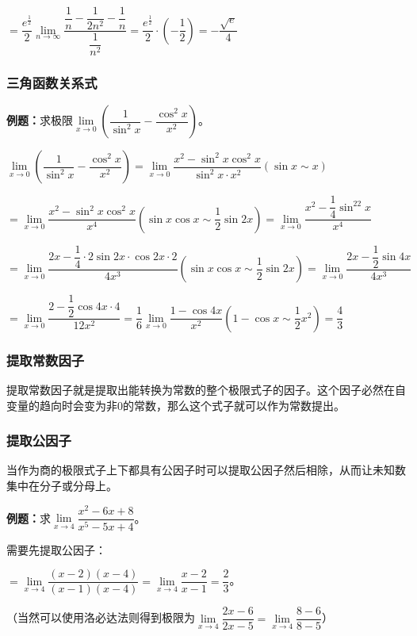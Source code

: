 \documentclass[UTF8, 12pt]{ctexart}
\begin{document}
$=\dfrac{e^{\frac{1}{2}}}{2}\lim\limits_{n\to\infty}\dfrac{\dfrac{1}{n}-\dfrac{1}{2n^2}-\dfrac{1}{n}}{\dfrac{1}{n^2}}=\dfrac{e^{\frac{1}{2}}}{2}\cdot\left(-\dfrac{1}{2}\right)=-\dfrac{\sqrt{e}}{4}$

\subsubsection{三角函数关系式}

\textbf{例题：}求极限$\lim\limits_{x\to 0}\left(\dfrac{1}{\sin^2x}-\dfrac{\cos^2x}{x^2}\right)$。\medskip

$\lim\limits_{x\to 0}\left(\dfrac{1}{\sin^2x}-\dfrac{\cos^2x}{x^2}\right)=\lim\limits_{x\to 0}\dfrac{x^2-\sin^2x\cos^2x}{\sin^2x\cdot x^2} (\sin x\sim x)$ \medskip

$=\lim\limits_{x\to 0}\dfrac{x^2-\sin^2x\cos^2x}{x^4} (\sin x\cos x\sim\dfrac{1}{2}\sin 2x)=\lim\limits_{x\to 0}\dfrac{x^2-\dfrac{1}{4}\sin^22x}{x^4}$ \medskip

$=\lim\limits_{x\to 0}\dfrac{2x-\dfrac{1}{4}\cdot 2\sin 2x\cdot\cos 2x\cdot 2}{4x^3} (\sin x\cos x\sim\dfrac{1}{2}\sin 2x)=\lim\limits_{x\to 0}\dfrac{2x-\dfrac{1}{2}\sin 4x}{4x^3}$ \medskip

$=\lim\limits_{x\to 0}\dfrac{2-\dfrac{1}{2}\cos 4x\cdot 4}{12x^2}=\dfrac{1}{6}\lim\limits_{x\to 0}\dfrac{1-\cos 4x}{x^2} (1-\cos x\sim \dfrac{1}{2}x^2)=\dfrac{4}{3}$

\subsubsection{提取常数因子}

提取常数因子就是提取出能转换为常数的整个极限式子的因子。这个因子必然在自变量的趋向时会变为非0的常数，那么这个式子就可以作为常数提出。

\subsubsection{提取公因子}

当作为商的极限式子上下都具有公因子时可以提取公因子然后相除，从而让未知数集中在分子或分母上。

\textbf{例题：}求$\lim\limits_{x\to 4}\dfrac{x^2-6x+8}{x^5-5x+4}$。

需要先提取公因子：

$=\lim\limits_{x\to 4}\dfrac{(x-2)(x-4)}{(x-1)(x-4)}=\lim\limits_{x\to 4}\dfrac{x-2}{x-1}=\dfrac{2}{3}$。

（当然可以使用洛必达法则得到极限为$\lim\limits_{x\to 4}\dfrac{2x-6}{2x-5}=\lim\limits_{x\to 4}\dfrac{8-6}{8-5}$）
\end{document}
